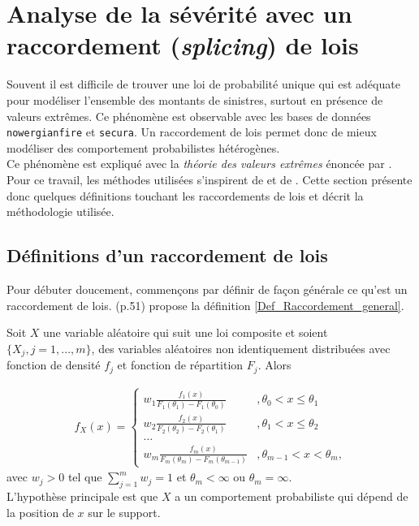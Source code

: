 \section{Analyse de la sévérité avec un raccordement (\textit{splicing}) de lois}\label{Section_Splicing}
	 Souvent il est difficile de trouver une loi de probabilité unique qui est adéquate pour modéliser l'ensemble des montants de sinistres, surtout en présence de valeurs extrêmes. Ce phénomène est observable avec les bases de données \texttt{nowergianfire} et \texttt{secura}. Un raccordement de lois permet donc de mieux modéliser des comportement probabilistes hétérogènes.\\
	 
	 Ce phénomène est expliqué avec la \textit{théorie des valeurs extrêmes} énoncée par \cite{gumbel1935valeurs}.\\
	 
	 Pour ce travail, les méthodes utilisées s'inspirent de \cite{albrecher2017reinsurance} et de \cite{brazauskas2016modeling}. Cette section présente donc quelques définitions touchant les raccordements de lois et décrit la méthodologie utilisée.
	
	\subsection{Définitions d'un raccordement de lois}
	Pour débuter doucement, commençons par définir de façon générale ce qu'est un raccordement de lois. \cite{albrecher2017reinsurance} (p.51) propose la définition \ref{Def_Raccordement_general}.
	
	\begin{Definition}\label{Def_Raccordement_general}
	Soit $X$ une variable aléatoire qui suit une loi composite et soient $\{X_j,j=1,...,m\}$, des variables aléatoires non identiquement distribuées avec fonction de densité $f_j$ et fonction de répartition $F_j$. Alors
	
	\begin{align}\label{Fonct_raccordement_general}
		f_X(x) = \left\{
		\begin{array}{ll}
		w_1 \frac{f_1(x)}{F_1(\theta_1)-F_1(\theta_0)} & ,\theta_0 < x \leq \theta_1 \\
		w_2 \frac{f_2(x)}{F_2(\theta_2)-F_2(\theta_1)} & ,\theta_1 < x \leq \theta_2 \\
		\dots & \\
		w_m \frac{f_m(x)}{F_m(\theta_m)-F_m(\theta_{m-1})} & ,\theta_{m-1} < x < \theta_m,
		\end{array}
		\right.
	\end{align}
	avec $w_j > 0$ tel que $\sum_{j=1}^{m} w_j = 1$ et $\theta_m<\infty$ ou $\theta_m = \infty $.\\
	
	L'hypothèse principale est que $X$ a un comportement probabiliste qui dépend de la position de $x $ sur le support.
	\end{Definition}

